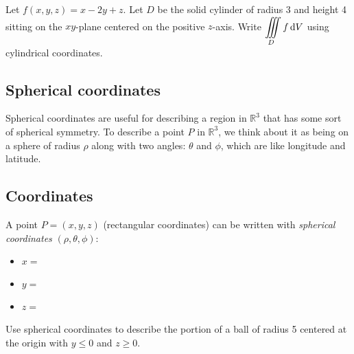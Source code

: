 \begin{ex}
    Let $f(x,y,z)=x-2y+z$. Let $D$ be the solid cylinder of radius 3 and height 4 sitting on the $xy$-plane centered on the positive $z$-axis. Write $\displaystyle\iiint\limits_D f\mathop{}\!\mathrm{d} V$ using cylindrical coordinates.
\end{ex}

\vfill

\pagebreak 
\subsection{Spherical coordinates}
Spherical coordinates are useful for describing a region in $\mathbb{R}^3$ that has some sort of spherical symmetry. To describe a point $P$ in $\mathbb{R}^3$, we think about it as being on a sphere of radius $\rho$ along with two angles: $\theta$ and $\phi$, which are like longitude and latitude.

\subsection{Coordinates}
A point $P=(x,y,z)$ (rectangular coordinates) can be written with \emph{spherical coordinates} $(\rho,\theta,\phi)$:
\begin{itemize}
    \item $x=\phantom{\rho\cos(\theta)\sin(\phi)}$
    \item $y=\phantom{\rho\sin(\theta)\sin(\phi)}$
    \item $z=\phantom{\rho\cos(\phi)}$
\end{itemize}

\vfill 



\begin{ex}
    Use spherical coordinates to describe the portion of a ball of radius 5 centered at the origin with $y\le0$ and $z\ge0$. %
\end{ex}

\vspace{1.5in}

\pagebreak 

